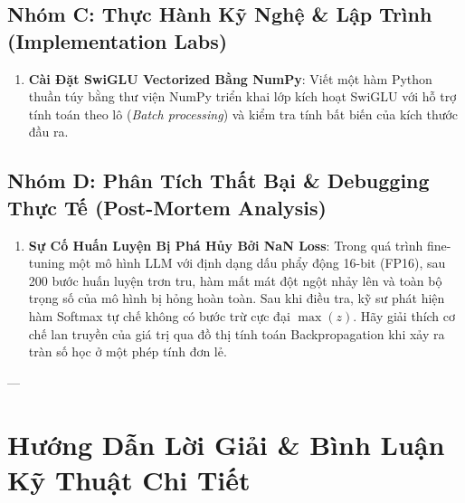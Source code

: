 \subsection{Nhóm C: Thực Hành Kỹ Nghệ \& Lập Trình (Implementation Labs)}

\begin{enumerate}[label=\textbf{C\arabic*.}]
  \item \textbf{Cài Đặt SwiGLU Vectorized Bằng NumPy}: Viết một hàm Python thuần túy bằng thư viện NumPy triển khai lớp kích hoạt SwiGLU với hỗ trợ tính toán theo lô (\textit{Batch processing}) và kiểm tra tính bất biến của kích thước đầu ra.
\end{enumerate}

\subsection{Nhóm D: Phân Tích Thất Bại \& Debugging Thực Tế (Post-Mortem Analysis)}

\begin{enumerate}[label=\textbf{D\arabic*.}]
  \item \textbf{Sự Cố Huấn Luyện Bị Phá Hủy Bởi NaN Loss}: Trong quá trình fine-tuning một mô hình LLM với định dạng dấu phẩy động 16-bit (FP16), sau 200 bước huấn luyện trơn tru, hàm mất mát đột ngột nhảy lên  và toàn bộ trọng số của mô hình bị hỏng hoàn toàn. Sau khi điều tra, kỹ sư phát hiện hàm Softmax tự chế không có bước trừ cực đại $\max(z)$. Hãy giải thích cơ chế lan truyền của giá trị  qua đồ thị tính toán Backpropagation khi xảy ra tràn số học ở một phép tính đơn lẻ.
\end{enumerate}

---

\section{Hướng Dẫn Lời Giải \& Bình Luận Kỹ Thuật Chi Tiết}
\label{sec:ch04-solutions}

